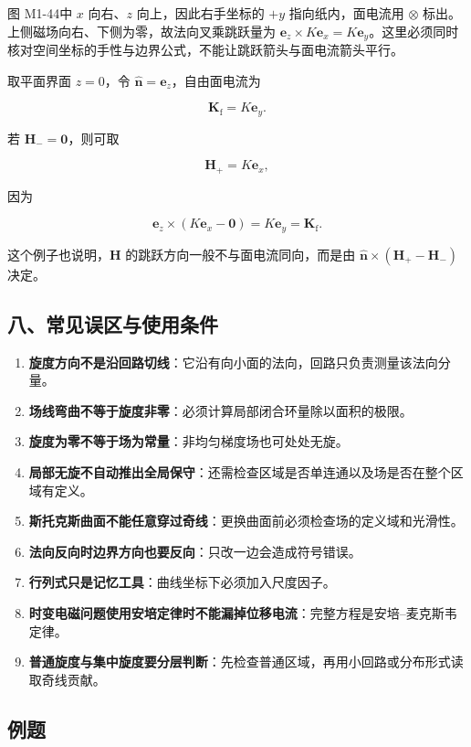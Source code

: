 图 M1-44中 \(x\) 向右、\(z\) 向上，因此右手坐标的 \(+y\)
指向纸内，面电流用 \(\otimes\)
标出。上侧磁场向右、下侧为零，故法向叉乘跳跃量为
\(\mathbf e_z\times K\mathbf e_x=K\mathbf e_y\)。这里必须同时核对空间坐标的手性与边界公式，不能让跳跃箭头与面电流箭头平行。

取平面界面 \(z=0\)，令 \(\hat{\mathbf n}=\mathbf e_z\)，自由面电流为

\[
\mathbf K_{\mathrm f}=K\mathbf e_y.
\]

若 \(\mathbf H_-=\mathbf0\)，则可取

\[
\mathbf H_+=K\mathbf e_x,
\]

因为

\[
\mathbf e_z\times
(K\mathbf e_x-\mathbf0)
=K\mathbf e_y
=\mathbf K_{\mathrm f}.
\]

这个例子也说明，\(\mathbf H\) 的跳跃方向一般不与面电流同向，而是由
\(\hat{\mathbf n}\times(\mathbf H_+-\mathbf H_-)\) 决定。

\subsection{八、常见误区与使用条件}\label{m1:ux516bux5e38ux89c1ux8befux533aux4e0eux4f7fux7528ux6761ux4ef6}

\begin{enumerate}
\def\labelenumi{\arabic{enumi}.}
\tightlist
\item
  \textbf{旋度方向不是沿回路切线}：它沿有向小面的法向，回路只负责测量该法向分量。
\item
  \textbf{场线弯曲不等于旋度非零}：必须计算局部闭合环量除以面积的极限。
\item
  \textbf{旋度为零不等于场为常量}：非均匀梯度场也可处处无旋。
\item
  \textbf{局部无旋不自动推出全局保守}：还需检查区域是否单连通以及场是否在整个区域有定义。
\item
  \textbf{斯托克斯曲面不能任意穿过奇线}：更换曲面前必须检查场的定义域和光滑性。
\item
  \textbf{法向反向时边界方向也要反向}：只改一边会造成符号错误。
\item
  \textbf{行列式只是记忆工具}：曲线坐标下必须加入尺度因子。
\item
  \textbf{时变电磁问题使用安培定律时不能漏掉位移电流}：完整方程是安培--麦克斯韦定律。
\item
  \textbf{普通旋度与集中旋度要分层判断}：先检查普通区域，再用小回路或分布形式读取奇线贡献。
\end{enumerate}

\subsection{例题}\label{m1:ux4f8bux9898-1}

